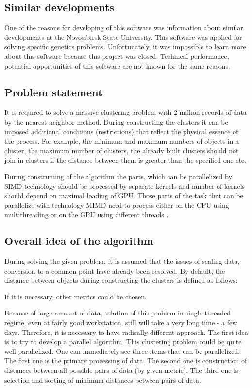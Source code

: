 \documentclass{TAACpaper}
\begin{document}
\subsection{Similar developments}
One of the reasons for developing of this software was information about similar developments at the Novosibirsk State University. This software was applied for solving specific genetics problems. Unfortunately, it was impossible to learn more about this software because this project was closed. Technical performance, potential opportunities of this software are not known for the same reasons.

\subsection{Problem statement}
It is required to solve a massive clustering problem with 2 million records of data by the nearest neighbor method. During constructing the clusters it can be imposed additional conditions (restrictions) that reflect the physical essence of the process. For example, the minimum and maximum numbers of objects in a cluster, the maximum number of clusters, the already built clusters should not join in clusters if the distance between them is greater than the specified one etc. 

During constructing of the algorithm the parts, which can be parallelized by SIMD technology should be processed by separate kernels and number of kernels should depend on maximal loading of GPU. Those parts of the task that can be parallelize with technology MIMD need to process either on the CPU using multithreading or on the GPU using different threads \cite{kepler}.

\subsection{Overall idea of the algorithm}
During solving the given problem, it is assumed that the issues of scaling data, conversion to a common point have already been resolved. By default, the distance between objects during constructing the clusters is defined as follows:


If it is necessary, other metrics could be chosen.

Because of large amount of data, solution of this problem in single-threaded regime, even at fairly good workstation, still will take a very long time - a few days. Therefore, it is necessary to have radically different approach. The first idea is to try to develop a parallel algorithm. This clustering problem could be quite well parallelized. One can immediately see three items that can be parallelized. The first one is the primary processing of data. The second one is construction of distances between all possible pairs of data (by given metric). The third one is selection and sorting of minimum distances between pairs of data.
\end{document}
